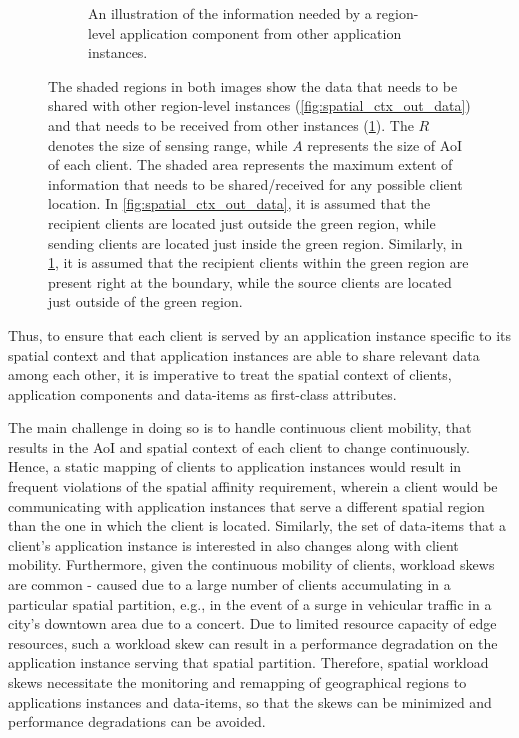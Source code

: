\begin{figure}
\begin{subfigure}{0.4\textwidth}
  \caption{An illustration of the information needed by a region-level application component from other application instances. }
  \label{fig:spatial_ctx_in_data}
\end{subfigure}
\caption{The shaded regions in both images show the data that needs to be shared with other region-level instances (\cref{fig:spatial_ctx_out_data}) and that needs to be received from other instances (\cref{fig:spatial_ctx_in_data}). The $R$ denotes the size of sensing range, while $A$ represents the size of AoI of each client. The shaded area represents the maximum extent of information that needs to be shared/received for any possible client location. In \cref{fig:spatial_ctx_out_data}, it is assumed that the recipient clients are located just outside the green region, while sending clients are located just inside the green region. Similarly, in \cref{fig:spatial_ctx_in_data}, it is assumed that the recipient clients within the green region are present right at the boundary, while the source clients are located just outside of the green region.}
\label{fig:spatial_data_sharing}
\end{figure}
Thus, to ensure that each client is served by an application instance specific to its spatial context and that application instances are able to share relevant data among each other, it is imperative to treat the spatial context of clients, application components and data-items as first-class attributes. 
\par The main challenge in doing so is to handle continuous client mobility, that results in the AoI and spatial context of each client to change continuously. Hence, a static mapping of clients to application instances would result in frequent violations of the spatial affinity requirement, wherein a client would be communicating with application instances that serve a different spatial region than the one in which the client is located. Similarly, the set of data-items that a client's application instance is interested in also changes along with client mobility. Furthermore, given the continuous mobility of clients, workload skews are common - caused due to a large number of clients accumulating in a particular spatial partition, e.g., in the event of a surge in vehicular traffic in a city's downtown area due to a concert. Due to limited resource capacity of edge resources, such a workload skew can result in a performance degradation on the application instance serving that spatial partition. Therefore, spatial workload skews necessitate the monitoring and remapping of geographical regions to applications instances and data-items, so that the skews can be minimized and performance degradations can be avoided.

